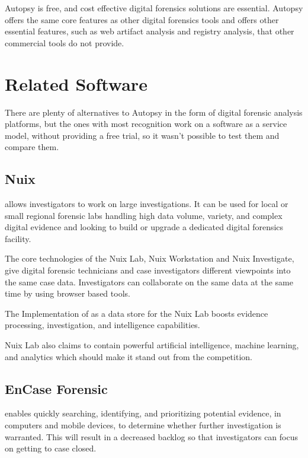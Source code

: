 Autopsy is free, and cost effective digital forensics solutions are essential. Autopsy offers
the same core features as other digital forensics tools and offers other essential features, such as web artifact analysis
and registry analysis, that other commercial tools do not provide.

\section{Related Software}

There are plenty of alternatives to Autopsy in the form of digital forensic analysis platforms, but the ones with most recognition work on a software as a service model, 
without providing a free trial, so it wasn't possible to test them and compare them.

\subsection{Nuix}

 \cite{nuix} allows investigators to work on large investigations.
It can be used for local or small regional forensic labs handling high data volume, variety, and 
complex digital evidence and looking to build or upgrade a dedicated digital forensics facility.

The core technologies of the Nuix Lab, Nuix Workstation and Nuix Investigate, give digital forensic technicians and case investigators 
different viewpoints into the same case data. Investigators can collaborate on 
the same data at the same time by using browser based tools.

The Implementation of  \cite{elasticsearch} as a data store for the Nuix Lab boosts evidence processing, investigation, and intelligence capabilities. 

Nuix Lab also claims to contain powerful artificial intelligence, machine learning, and analytics which should make it stand out from the competition. 

\subsection{EnCase Forensic}

 \cite{encase} enables quickly searching, identifying, and prioritizing potential evidence, in computers and mobile devices, to determine whether 
further investigation is warranted. This will result in a decreased backlog so that investigators can focus on getting to case closed. 

